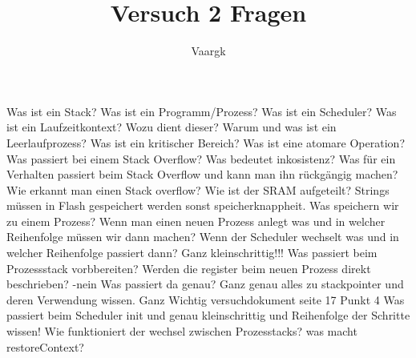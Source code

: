 \documentclass[12pt]{article}
\title{Versuch 2 Fragen}
\author{
        Vaargk
}
\begin{document}
\maketitle
Was ist ein Stack?
Was ist ein Programm/Prozess?
Was ist ein Scheduler?
Was ist ein Laufzeitkontext? Wozu dient dieser?
Warum und was ist ein Leerlaufprozess?
Was ist ein kritischer Bereich? Was ist eine atomare Operation?
Was passiert bei einem Stack Overflow? Was bedeutet inkosistenz?
Was für ein Verhalten passiert beim Stack Overflow und kann man ihn rückgängig machen?
Wie erkannt man einen Stack overflow?
Wie ist der SRAM aufgeteilt?
Strings müssen in Flash gespeichert werden sonst speicherknappheit.
Was speichern wir zu einem Prozess?
Wenn man einen neuen Prozess anlegt was und in welcher Reihenfolge müssen wir dann machen?
Wenn der Scheduler wechselt was und in welcher Reihenfolge passiert dann? Ganz kleinschrittig!!!
Was passiert beim Prozessstack vorbbereiten?
Werden die register beim neuen Prozess direkt beschrieben? -nein Was passiert da genau?
Ganz genau alles zu stackpointer und deren Verwendung wissen. Ganz Wichtig versuchdokument seite 17 Punkt 4
Was passiert beim Scheduler init und genau kleinschrittig und Reihenfolge der Schritte wissen!
Wie funktioniert der wechsel zwischen Prozesstacks?
was macht restoreContext?
\end{document}
